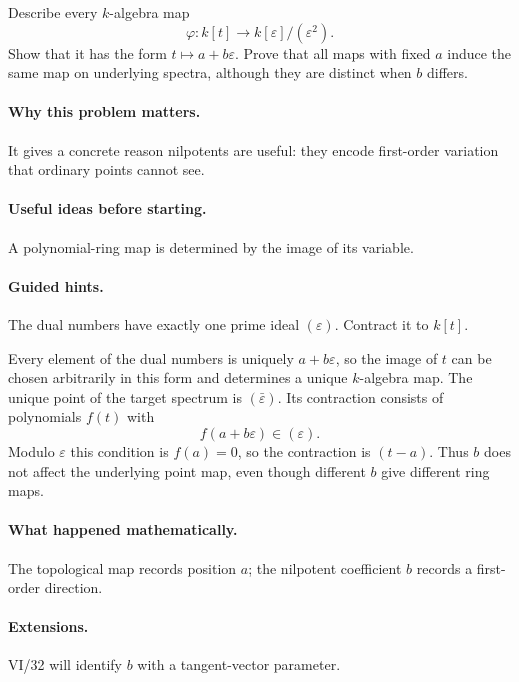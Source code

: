 \begin{problem}
Describe every $k$-algebra map
\[
\varphi:k[t]\to k[\varepsilon]/(\varepsilon^2).
\]
Show that it has the form $t\mapsto a+b\varepsilon$.  Prove that all maps with fixed $a$
induce the same map on underlying spectra, although they are distinct when $b$ differs.
\end{problem}
\paragraph{Why this problem matters.}
It gives a concrete reason nilpotents are useful: they encode first-order variation that
ordinary points cannot see.
\paragraph{Useful ideas before starting.}
A polynomial-ring map is determined by the image of its variable.
\paragraph{Guided hints.}
The dual numbers have exactly one prime ideal $(\varepsilon)$.  Contract it to $k[t]$.
\begin{solution}
Every element of the dual numbers is uniquely $a+b\varepsilon$, so the image of $t$ can be
chosen arbitrarily in this form and determines a unique $k$-algebra map.  The unique point
of the target spectrum is $(\bar\varepsilon)$.  Its contraction consists of polynomials
$f(t)$ with
\[
f(a+b\varepsilon)\in(\varepsilon).
\]
Modulo $\varepsilon$ this condition is $f(a)=0$, so the contraction is $(t-a)$.  Thus $b$
does not affect the underlying point map, even though different $b$ give different ring maps.
\end{solution}
\paragraph{What happened mathematically.}
The topological map records position $a$; the nilpotent coefficient $b$ records a first-order
direction.
\paragraph{Extensions.}
VI/32 will identify $b$ with a tangent-vector parameter.
